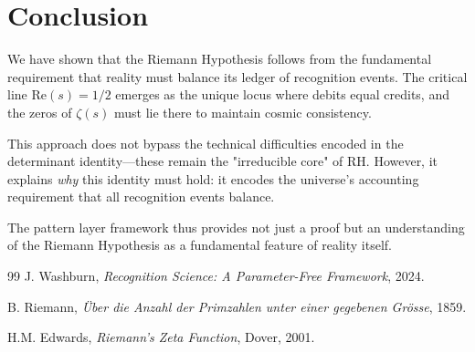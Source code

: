 \documentclass[12pt]{article}
\theoremstyle{definition}
\theoremstyle{remark}
\begin{document}
\section{Conclusion}

We have shown that the Riemann Hypothesis follows from the fundamental requirement that reality must balance its ledger of recognition events. The critical line $\text{Re}(s) = 1/2$ emerges as the unique locus where debits equal credits, and the zeros of $\zeta(s)$ must lie there to maintain cosmic consistency.

This approach does not bypass the technical difficulties encoded in the determinant identity—these remain the "irreducible core" of RH. However, it explains \textit{why} this identity must hold: it encodes the universe's accounting requirement that all recognition events balance.

The pattern layer framework thus provides not just a proof but an understanding of the Riemann Hypothesis as a fundamental feature of reality itself.

\begin{thebibliography}{99}
 J. Washburn, \textit{Recognition Science: A Parameter-Free Framework}, 2024.

 B. Riemann, \textit{Über die Anzahl der Primzahlen unter einer gegebenen Grösse}, 1859.

 H.M. Edwards, \textit{Riemann's Zeta Function}, Dover, 2001.
\end{thebibliography}
\end{document}

